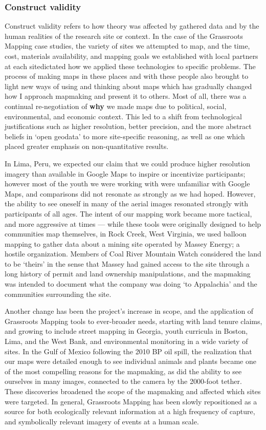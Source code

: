 \documentclass[11pt,oneside,notitlepage]{report}
\begin{document}
\subsubsection{Construct validity}

Construct validity refers to how theory was affected by gathered data and by the human realities of the research site or context. In the case of the Grassroots Mapping case studies, the variety of sites we attempted to map, and the time, cost, materials availability, and mapping goals we established with local partners at each sitedictated how we applied these technologies to specific problems. The process of making maps in these places and with these people also brought to light new ways of using and thinking about maps which has gradually changed how I approach mapmaking and present it to others. Most of all, there was a continual re-negotiation of \textbf{why} we made maps due to political, social, environmental, and economic context. This led to a shift from technological justifications such as higher resolution, better precision, and the more abstract beliefs in `open geodata' to more site-specific reasoning, as well as one which placed greater emphasis on non-quantitative results.  

In Lima, Peru, we expected our claim that we could produce higher resolution imagery than available in Google Maps to inspire or incentivize participants; however most of the youth we were working with were unfamiliar with Google Maps, and comparisons did not resonate as strongly as we had hoped. However, the ability to see oneself in many of the aerial images resonated strongly with participants of all ages. The intent of our mapping work became more tactical, and more aggressive at times --- while these tools were originally designed to help communities map themselves, in Rock Creek, West Virginia, we used balloon mapping to gather data about a mining site operated by Massey Energy; a hostile organization. Members of Coal River Mountain Watch considered the land to be `theirs' in the sense that Massey had gained access to the site through a long history of permit and land ownership manipulations, and the mapmaking was intended to document what the company was doing `to Appalachia' and the communities surrounding the site.

Another change has been the project's increase in scope, and the application of Grassroots Mapping tools to ever-broader needs, starting with land tenure claims, and growing to include street mapping in Georgia, youth curricula in Boston, Lima, and the West Bank, and environmental monitoring in a wide variety of sites. In the Gulf of Mexico following the 2010 BP oil spill, the realization that our maps were detailed enough to see individual animals and plants became one of the most compelling reasons for the mapmaking, as did the ability to see ourselves in many images, connected to the camera by the 2000-foot tether. These discoveries broadened the scope of the mapmaking and affected which sites were targeted. In general, Grassroots Mapping has been slowly repositioned as a source for both ecologically relevant information at a high frequency of capture, and symbolically relevant imagery of events at a human scale.
\end{document}
